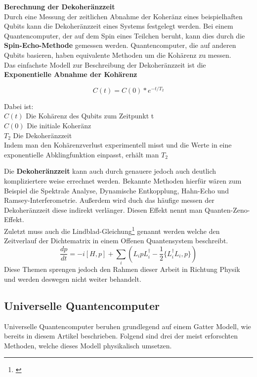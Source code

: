 \textbf{Berechnung der Dekoheränzzeit}\\
Durch eine Messung der zeitlichen Abnahme der Koheränz eines beispielhaften Qubits kann die Dekoheränzzeit eines Systems festgelegt werden.
Bei einem Quantencomputer, der auf dem Spin eines Teilchen beruht, kann dies durch die \textbf{Spin-Echo-Methode} gemessen werden.
Quantencomputer, die auf anderen Qubits basieren, haben equivalente Methoden um die Kohärenz zu messen.\\

Das einfachste Modell zur Beschreibung der Dekoheränzzeit ist die \textbf{Exponentielle Abnahme der Kohärenz}

\begin{equation}
    C(t) = C(0)*e^{-t/T_2}
\end{equation}

Dabei ist:\\
$C(t)$ Die Kohärenz des Qubits zum Zeitpunkt t\\
$C(0)$ Die initiale Koheränz\\
$T_2$ Die Dekoheränzzeit\\

Indem man den Kohärenzverlust experimentell misst und die Werte in eine exponentielle Abklingfunktion einpasst, erhält man $T_2$\\

\begin{tcolorbox}[title=Kommentar,
    title filled=false,
    colback=cyan!5!white,
    colframe=cyan!75!black]
    Die \textbf{Dekoheränzzeit} kann auch durch genauere jedoch auch deutlich kompliziertere weise errechnet werden.
    Bekannte Methoden hierfür wären zum Beispiel die Spektrale Analyse, Dynamische Entkopplung, Hahn-Echo und Ramsey-Interferometrie.
    Außerdem wird duch das häufige messen der Dekoheränzzeit diese indirekt verlänger. Diesen Effekt nennt man Quanten-Zeno-Effekt.\\
    Zuletzt muss auch die Lindblad-Gleichung\footnote{\cite{bacciagaluppi_role_2020}} genannt werden welche den Zeitverlauf der Dichtematrix in einem Offenen Quantensystem beschreibt.
    \begin{equation}
        \frac{dp}{dt} = -i[H,p]+\sum_i(L_ipL^\dagger_i-\frac{1}{2}\{L^\dagger_i L_i,p\})
    \end{equation}
    Diese Themen sprengen jedoch den Rahmen dieser Arbeit in Richtung Physik und werden deswegen nicht weiter behandelt.
\end{tcolorbox}

\subsection{Universelle Quantencomputer}
\label{sub:universelle_quantencomputer}
Universelle Quantencomputer beruhen grundlegend auf einem Gatter Modell, wie bereits in diesem Artikel beschrieben. Folgend sind drei der meist erforschten
Methoden, welche dieses Modell physikalisch umsetzen.\\

